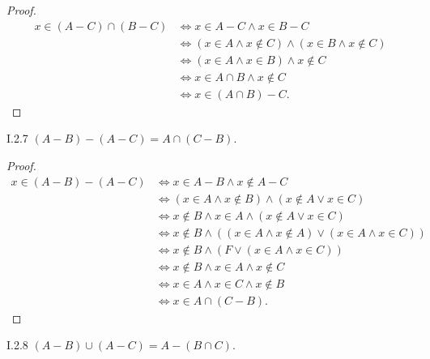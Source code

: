 \begin{proof}
	\begingroup
	\allowdisplaybreaks%
	\begin{align*}
		x \in (A - C) \cap (B - C) & \iff x \in A - C \land x \in B - C                               \\
		                           & \iff (x \in A \land x \notin C) \land (x \in B \land x \notin C) \\
		                           & \iff (x \in A \land x \in B) \land x \notin C                    \\
		                           & \iff x \in A\cap B \land x \notin C                              \\
		                           & \iff x \in (A \cap B) - C.
	\end{align*}
	\endgroup
\end{proof}

\begin{problem}{I.2.7}
\( (A - B) - (A - C) = A \cap (C - B) \).
\end{problem}

\begin{proof}
	\begingroup
	\allowdisplaybreaks%
	\begin{align*}
		x \in (A - B) - (A - C) & \iff x \in A - B \land x \notin A - C                                         \\
		                        & \iff (x \in A \land x \notin B) \land (x \notin A \lor x \in C)               \\
		                        & \iff x \notin B \land x \in A \land (x \notin A \lor x \in C)                 \\
		                        & \iff x \notin B \land ((x \in A \land x\notin A) \lor (x\in A \land x \in C)) \\
		                        & \iff x \notin B \land (F \lor (x \in A \land x \in C))                        \\
		                        & \iff x \notin B \land x \in A \land x \notin C                                \\
		                        & \iff x \in A \land x \in C \land x \notin B                                   \\
		                        & \iff x \in A \cap (C - B).
	\end{align*}
	\endgroup
\end{proof}

\begin{problem}{I.2.8}
\( (A - B) \cup (A - C) = A - (B \cap C) \).
\end{problem}

